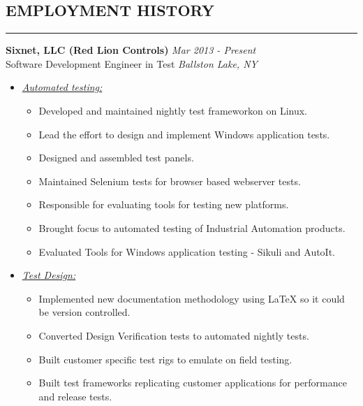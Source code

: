 \documentclass{article}
\begin{document}
\subsection*{\MakeUppercase{\bf Employment History}}
    \hrule
    \bigskip
    {\bf Sixnet, LLC (Red Lion Controls)} \hfill {\em Mar 2013 - Present} \\
    Software Development Engineer in Test \hfill {\em Ballston Lake, NY} \\
    \begin{itemize}
    \item \underline{\it Automated testing:}
          \begin{itemize}
          \item Developed and maintained nightly test frameworkon on Linux.
          \item Lead the effort to design and implement Windows application
                tests.
          \item Designed and assembled test panels.
          \item Maintained Selenium tests for browser based webserver tests.
          \item Responsible for evaluating tools for testing new platforms.
          \item Brought focus to automated testing of Industrial Automation
                products.
          \item Evaluated Tools for Windows application testing - Sikuli and
                AutoIt.
          \end{itemize}
    \item \underline{\it Test Design:}
          \begin{itemize}
          \item Implemented new documentation methodology using {\LaTeX} so
                it could be version controlled.
          \item Converted Design Verification tests to automated nightly tests.
          \item Built customer specific test rigs to emulate on field testing.
          \item Built test frameworks replicating customer applications for
                performance and release tests.
          \end{itemize}
    \end{itemize}
    \smallskip
\end{document}
